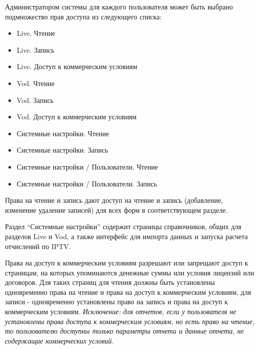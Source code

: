 Администратором системы для каждого пользователя может быть выбрано подмножество прав доступа из следующего списка:
\begin{itemize}
\item{
Live. Чтение
}
\item{
Live. Запись
}
\item{
Live. Доступ к коммерческим условиям
}
\item{
Vod. Чтение
}
\item{
Vod. Запись
}
\item{
Vod. Доступ к коммерческим условиям
}
\item{
Системные настройки. Чтение
}
\item{
Системные настройки. Запись
}
\item{
Системные настройки / Пользователи. Чтение
}
\item{
Системные настройки / Пользователи. Запись
}
\end{itemize}

Права на чтение и запись дают доступ на чтение и запись (добавление, изменение удаление записей) для всех форм в соответствующем разделе.

Раздел ``Системные настройки'' содержит страницы справочников, общих для разделов Live и Vod, а также интерфейс для
импорта данных и запуска расчета отчислений по IPTV.

Права на доступ к коммерческим условиям разрешают или запрещают доступ к страницам, на которых упоминаются денежные суммы 
или условия лицензий или договоров. Для таких страниц для чтения должны быть установлены одновременно права на чтение и 
права на доступ к коммерческим условиям, для записи - одновременно установлены право на запись и права на доступ к 
коммерческим условиям. \textit{Исключение: для отчетов, если у пользователя не установлены права доступа к коммерческим условиям, 
но есть право на чтение, то пользователю доступны только параметры отчета и данные отчета, не содержащие коммерческих условий.}
